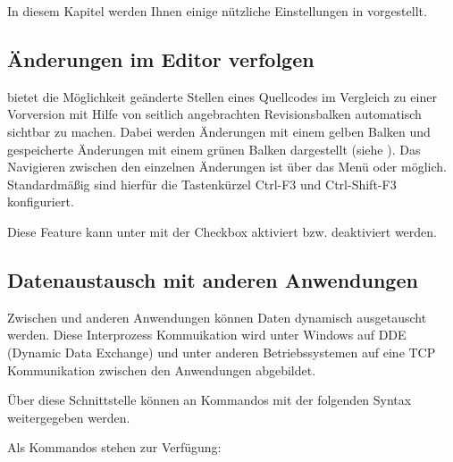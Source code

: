 In diesem Kapitel werden Ihnen einige nützliche Einstellungen in \codeblocks vorgestellt.

\subsection{Änderungen im Editor verfolgen}

\codeblocks bietet die Möglichkeit geänderte Stellen eines Quellcodes im Vergleich zu einer Vorversion mit Hilfe von seitlich angebrachten Revisionsbalken automatisch sichtbar zu machen. Dabei werden Änderungen mit einem gelben Balken und gespeicherte Änderungen mit einem grünen Balken dargestellt (siehe ). Das Navigieren zwischen den einzelnen Änderungen ist über das Menü  oder  möglich. Standardmäßig sind hierfür die Tastenkürzel Ctrl-F3 und Ctrl-Shift-F3 konfiguriert.


Diese Feature kann unter  mit der Checkbox  aktiviert bzw. deaktiviert werden.


\subsection{Datenaustausch mit anderen Anwendungen}

Zwischen \codeblocks und anderen Anwendungen können Daten dynamisch ausgetauscht werden. Diese Interprozess Kommuikation wird unter Windows auf DDE (Dynamic Data Exchange) und unter anderen Betriebssystemen auf eine TCP Kommunikation zwischen den Anwendungen abgebildet.

Über diese Schnittstelle können an \codeblocks Kommandos mit der folgenden Syntax weitergegeben werden.


Als Kommandos stehen zur Verfügung:

